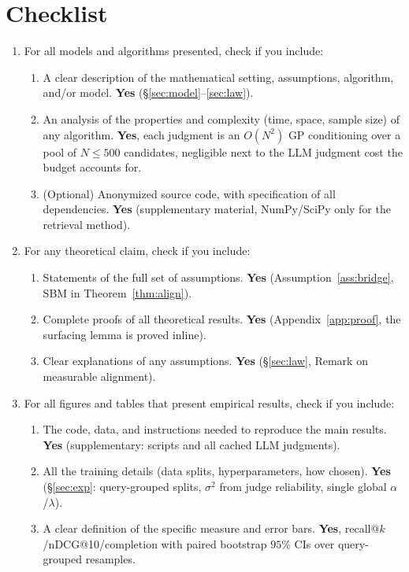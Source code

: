 \documentclass[twoside]{article}
\theoremstyle{plain}
\theoremstyle{definition}
\begin{document}
\section*{Checklist}
\begin{enumerate}
  \item For all models and algorithms presented, check if you include:
  \begin{enumerate}
    \item A clear description of the mathematical setting, assumptions, algorithm, and/or model. \textbf{Yes} (\S\ref{sec:model}--\ref{sec:law}).
    \item An analysis of the properties and complexity (time, space, sample size) of any algorithm. \textbf{Yes}, each judgment is an $O(N^2)$ GP conditioning over a pool of $N\le500$ candidates, negligible next to the LLM judgment cost the budget accounts for.
    \item (Optional) Anonymized source code, with specification of all dependencies. \textbf{Yes} (supplementary material, NumPy/SciPy only for the retrieval method).
  \end{enumerate}
  \item For any theoretical claim, check if you include:
  \begin{enumerate}
    \item Statements of the full set of assumptions. \textbf{Yes} (Assumption~\ref{ass:bridge}, SBM in Theorem~\ref{thm:align}).
    \item Complete proofs of all theoretical results. \textbf{Yes} (Appendix~\ref{app:proof}, the surfacing lemma is proved inline).
    \item Clear explanations of any assumptions. \textbf{Yes} (\S\ref{sec:law}, Remark on measurable alignment).
  \end{enumerate}
  \item For all figures and tables that present empirical results, check if you include:
  \begin{enumerate}
    \item The code, data, and instructions needed to reproduce the main results. \textbf{Yes} (supplementary: scripts and all cached LLM judgments).
    \item All the training details (data splits, hyperparameters, how chosen). \textbf{Yes} (\S\ref{sec:exp}: query-grouped splits, $\sigma^2$ from judge reliability, single global $\alpha$/$\lambda$).
    \item A clear definition of the specific measure and error bars. \textbf{Yes}, recall@$k$/nDCG@10/completion with paired bootstrap $95\%$ CIs over query-grouped resamples.

\end{enumerate}
\end{enumerate}
\end{document}

